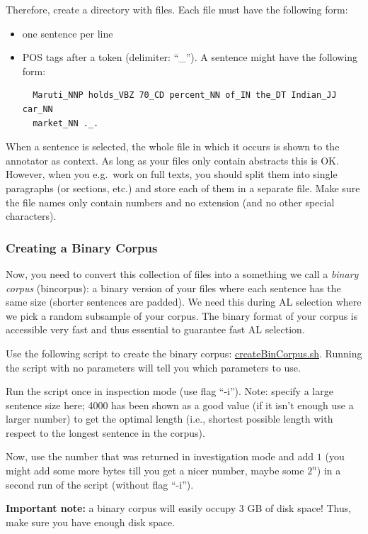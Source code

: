 \documentclass[DIV12,english,11pt,halfparskip]{scrartcl}
\begin{document}
\begin{appendix}
Therefore, create a directory with files. Each file must have the
following form:
\begin{itemize}
\item one sentence per line
\item POS tags after a token (delimiter: ``\_''). A sentence might
  have the following form:
\begin{verbatim}
  Maruti_NNP holds_VBZ 70_CD percent_NN of_IN the_DT Indian_JJ car_NN
  market_NN ._.
\end{verbatim}
\end{itemize}

When a sentence is selected, the whole file in which it occurs is
shown to the annotator as context. As long as your files only contain
abstracts this is OK. However, when you e.g.\ work on full texts, you
should split them into single paragraphs (or sections, etc.) and store
each of them in a separate file. Make sure the file names only contain
numbers and no extension (and no other special characters).

\subsubsection{Creating a Binary Corpus}

Now, you need to convert this collection of files into a something we
call a \emph{binary corpus} (bincorpus): a binary version of your
files where each sentence has the same size (shorter sentences are
padded). We need this during AL selection where we pick a random
subsample of your corpus. The binary format of your corpus is
accessible very fast and thus essential to guarantee fast AL
selection.

Use the following script to create the binary corpus:
\url{createBinCorpus.sh}. Running the script with no parameters will
tell you which parameters to use.

Run the script once in inspection mode (use flag ``-i''). Note:
specify a large sentence size here; 4000 has been shown as a good
value (if it isn't enough use a larger number) to get the optimal
length (i.e., shortest possible length with respect to the longest
sentence in the corpus).

Now, use the number that was returned in investigation mode and add
$1$ (you might add some more bytes till you get a nicer number, maybe
some $2^n$) in a second run of the script (without flag ``-i'').

\textbf{Important note:} a binary corpus will easily occupy 3 GB of
disk space! Thus, make sure you have enough disk space.



\end{appendix}
\end{document}
